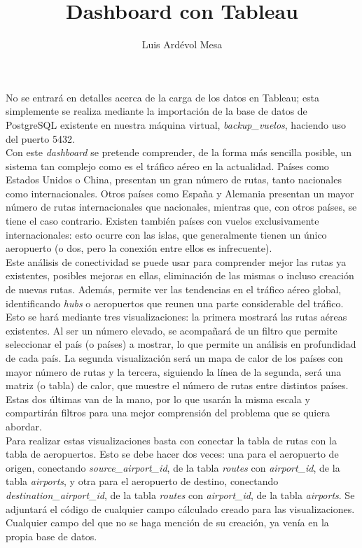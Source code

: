 \documentclass[11pt]{opticajnl}
\title{Dashboard con Tableau}
\author[1,2,3]{Luis Ardévol Mesa}
\begin{document}
\maketitle

No se entrará en detalles acerca de la carga de los datos en Tableau; esta simplemente se realiza mediante la importación de la base de datos de PostgreSQL existente en nuestra máquina virtual, \textit{backup\_vuelos}, haciendo uso del puerto 5432. \\

Con este \textit{dashboard} se pretende comprender, de la forma más sencilla posible, un sistema tan complejo como es el tráfico aéreo en la actualidad. Países como Estados Unidos o China, presentan un gran número de rutas, tanto nacionales como internacionales. Otros países como España y Alemania presentan un mayor número de rutas internacionales que nacionales, mientras que, con otros países, se tiene el caso contrario. Existen también países con vuelos exclusivamente internacionales: esto ocurre con las islas, que generalmente tienen un único aeropuerto (o dos, pero la conexión entre ellos es infrecuente). \\

Este análisis de conectividad se puede usar para comprender mejor las rutas ya existentes, posibles mejoras en ellas, eliminación de las mismas o incluso creación de nuevas rutas. Además, permite ver las tendencias en el tráfico aéreo global, identificando \textit{hubs} o aeropuertos que reunen una parte considerable del tráfico. \\

Esto se hará mediante tres visualizaciones: la primera mostrará las rutas aéreas existentes. Al ser un número elevado, se acompañará de un filtro que permite seleccionar el país (o países) a mostrar, lo que permite un análisis en profundidad de cada país. La segunda visualización será un mapa de calor de los países con mayor número de rutas y la tercera, siguiendo la línea de la segunda, será una matriz (o tabla) de calor, que muestre el número de rutas entre distintos países. Estas dos últimas van de la mano, por lo que usarán la misma escala y compartirán filtros para una mejor comprensión del problema que se quiera abordar. \\

Para realizar estas visualizaciones basta con conectar la tabla de rutas con la tabla de aeropuertos. Esto se debe hacer dos veces: una para el aeropuerto de origen, conectando \textit{source\_airport\_id}, de la tabla \textit{routes} con \textit{airport\_id}, de la tabla \textit{airports}, y otra para el aeropuerto de destino, conectando \textit{destination\_airport\_id}, de la tabla \textit{routes} con \textit{airport\_id}, de la tabla \textit{airports}. Se adjuntará el código de cualquier campo cálculado creado para las visualizaciones. Cualquier campo del que no se haga mención de su creación, ya venía en la propia base de datos. 
\end{document}

